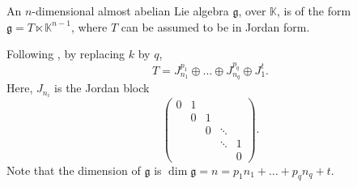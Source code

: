 \documentclass[a4paper,11pt]{amsart}
\theoremstyle{definition}
\theoremstyle{remark}
\numberwithin{equation}{section}
\newcommand{\g}{\mathfrak{g}}
\newcommand{\K}{\mathbb{K}}
\begin{document}
An $n$-dimensional almost abelian Lie algebra $\g$, over $\K$, is of the form $\g=T\ltimes\K^{n-1}$,
where $T$ can be assumed to be in Jordan form.

Following \cite{ABDGH}, by replacing $k$ by $q$,
\[ T=J_{n_1}^{p_1} \oplus \dots \oplus J_{n_q}^{p_q} \oplus J_1^t. \]
Here, $J_{n_i}$ is the Jordan block
\[ \begin{pmatrix} 0 & 1 & & & \\ 
                     & 0 & 1 & & \\
                     & & 0 & \ddots & \\
                     & & & \ddots & 1 \\
                     & & & & 0
   \end{pmatrix}.
\]
Note that the dimension of $\g$ is $\dim\g=n=p_1 n_1+\dots+p_q n_q+t$.
\end{document}
